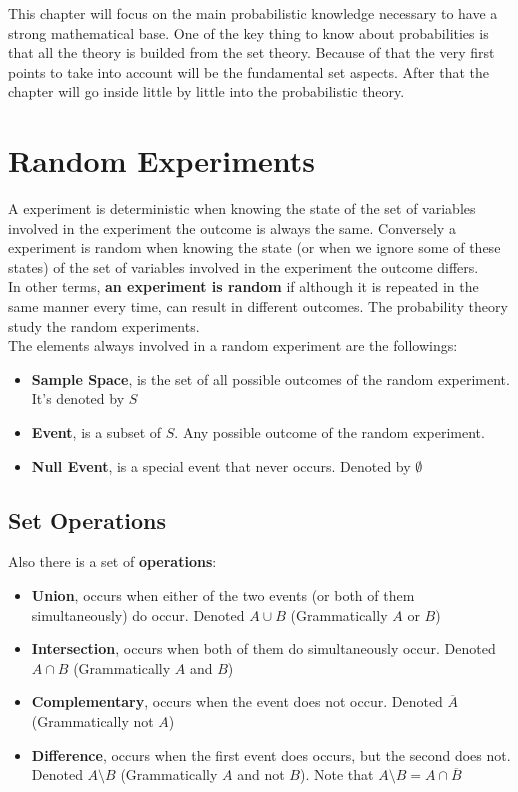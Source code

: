 This chapter will focus on the main probabilistic knowledge necessary to have a strong mathematical base. One of the key thing to know about
probabilities is that all the theory is builded from the set theory. Because of that the very first points to take into account will be the
fundamental set aspects. After that the chapter will go inside little by little into the probabilistic theory.

\section{Random Experiments}
 A experiment is deterministic when knowing the state of the set of variables involved in the experiment the outcome is always the same.
 Conversely a experiment is random when knowing the state (or when we ignore some of these states) of the set of variables involved in
 the experiment the outcome differs. \\
 
 In other terms, \textbf{an experiment is random} if although it is repeated in the same manner every time, can result in different outcomes.
 The probability theory study the random experiments.\\

 The elements always involved in a random experiment are the followings:
 \begin{itemize}
     \item \textbf{Sample Space}, is the set of all possible outcomes of the random experiment. It's denoted by $S$
     \item \textbf{Event}, is a subset of $S$. Any possible outcome of the random experiment. 
     \item \textbf{Null Event}, is a special event that never occurs. Denoted by $\emptyset$
 \end{itemize}

 \subsection{Set Operations}
 Also there is a set of \textbf{operations}:
 \begin{itemize}
     \item \textbf{Union}, occurs when either of the two events (or both of them simultaneously) do occur. Denoted $A \cup B$ (Grammatically $A$ or $B$)
     \item \textbf{Intersection}, occurs when both of them do simultaneously occur. Denoted $A \cap B$ (Grammatically $A$ and $B$)
     \item \textbf{Complementary}, occurs when the event does not occur. Denoted $\overline{A}$ (Grammatically not $A$)
     \item \textbf{Difference}, occurs when the first event does occurs, but the second does not. Denoted $A \setminus B$ (Grammatically $A$ and not $B$).
        Note that $A \setminus B = A \cap \overline{B}$
 \end{itemize}

